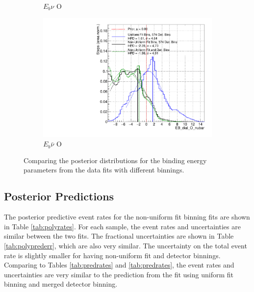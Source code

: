 \begin{figure}
\begin{subfigure}{.48\textwidth}
  \caption{$E_{b}\nu$ O}
\end{subfigure}
\begin{subfigure}{.48\textwidth}
  \centering
  \includegraphics[width=0.73\linewidth]{figs/PolyComp_EB_dial_O_nubar}
  \caption{$E_{b}\bar{\nu}$ O}
\end{subfigure}
\caption{Comparing the posterior distributions for the binding energy parameters from the data fits with different binnings.}
\label{fig:polyEbdata}
\end{figure}

\subsection{Posterior Predictions}

The posterior predictive event rates for the non-uniform fit binning fits are shown in Table \ref{tab:polyrates}. For each sample, the event rates and uncertainties are similar between the two fits. The fractional uncertainties are shown in Table \ref{tab:polyprederr}, which are also very similar. The uncertainty on the total event rate is slightly smaller for having non-uniform fit and detector binnings. Comparing to Tables \ref{tab:predrates} and \ref{tab:predrates}, the event rates and uncertainties are very similar to the prediction from the fit using uniform fit binning and merged detector binning.

